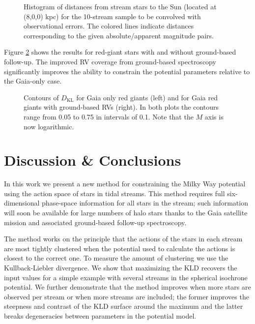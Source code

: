 \documentclass{emulateapj}
\newcommand{\sub}[2]{\ensuremath{#1_{\mathrm{#2}}}}
\begin{document}
\begin{figure}
\caption{Histogram of distances from stream stars to the Sun (located at (8,0,0) kpc) for the 10-stream sample to be convolved with observational errors. The colored lines indicate distances corresponding to the given absolute/apparent magnitude pairs.}
\label{fig:distanceHistogram}
\end{figure}



Figure \ref{fig:errorConvResults} shows the results for red-giant stars with and without ground-based follow-up. The improved RV coverage from ground-based spectroscopy significantly improves the ability to constrain the potential parameters relative to the Gaia-only case. 

\begin{figure}
\caption{Contours of $\sub{D}{KL}$ for Gaia only red giants (left) and for Gaia red giants with ground-based RVs (right). In both plots the contours range from 0.05 to 0.75 in intervals of 0.1. Note that the $M$ axis is now logarithmic.}
\label{fig:errorConvResults}
\end{figure}


\section{Discussion \& Conclusions}

In this work we present a new method for constraining the Milky Way potential using the action space of stars in tidal streams. This method requires full six-dimensional phase-space information for all stars in the stream; such information will soon be available for large numbers of halo stars thanks to the Gaia satellite mission and associated ground-based follow-up spectroscopy. 

The method works on the principle that the actions of the stars in each stream are most tightly clustered when the potential used to calculate the actions is closest to the correct one. To measure the amount of clustering we use the Kullback-Liebler divergence. We show that maximizing the KLD recovers the input values for a simple example with several streams in the spherical isochrone potential. We further demonstrate that the method improves when more stars are observed per stream or when more streams are included; the former improves the steepness and contrast of the KLD surface around the maximum and the latter breaks degeneracies between parameters in the potential model. 
\end{document}
